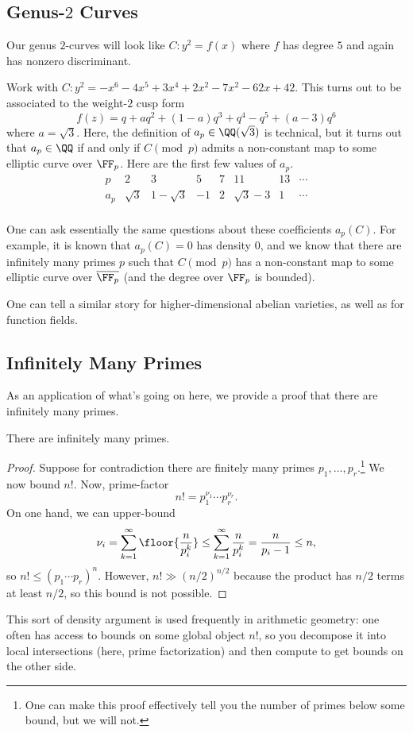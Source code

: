 \documentclass{article}
\begin{document}
\subsection{Genus-\texorpdfstring{$2$}{2} Curves}
Our genus $2$-curves will look like $C\colon y^2=f(x)$ where $f$ has degree $5$ and again has nonzero discriminant.
\begin{example}
	Work with $C\colon y^2=-x^6-4x^5+3x^4+2x^2-7x^2-62x+42$. This turns out to be associated to the weight-$2$ cusp form
	\[f(z)=q+aq^2+(1-a)q^3+q^4-q^5+(a-3)q^6\]
	where $a=\sqrt3$. Here, the definition of $a_p\in\QQ(\sqrt 3)$ is technical, but it turns out that $a_p\in\QQ$ if and only if $C\pmod p$ admits a non-constant map to some elliptic curve over $\FF_p$. Here are the first few values of $a_p$.
	\[\begin{array}{c|cccccccc}
		p & 2 & 3 & 5 & 7 & 11 & 13 & \cdots \\\hline
		a_p & \sqrt3 & 1-\sqrt3 & -1 & 2 & \sqrt3-3 & 1 & \cdots \\
	\end{array}\]
\end{example}
One can ask essentially the same questions about these coefficients $a_p(C)$. For example, it is known that $a_p(C)=0$ has density $0$, and we know that there are infinitely many primes $p$ such that $C\pmod p$ has a non-constant map to some elliptic curve over $\overline{\FF_p}$ (and the degree over $\FF_p$ is bounded).
\begin{remark}
	One can tell a similar story for higher-dimensional abelian varieties, as well as for function fields.
\end{remark}

\subsection{Infinitely Many Primes}
As an application of what's going on here, we provide a proof that there are infinitely many primes.
\begin{theorem}
	There are infinitely many primes.
\end{theorem}
\begin{proof}
	Suppose for contradiction there are finitely many primes $p_1,\ldots,p_r$.\footnote{One can make this proof effectively tell you the number of primes below some bound, but we will not.} We now bound $n!$. Now, prime-factor
	\[n!=p_1^{\nu_1}\cdots p_r^{\nu_r}.\]
	On one hand, we can upper-bound
	\[\nu_i=\sum_{k=1}^\infty\floor{\frac n{p_i^k}}\le\sum_{k=1}^\infty\frac n{p_i^k}=\frac n{p_i-1}\le n,\]
	so $n!\le(p_1\cdots p_r)^n$. However, $n!\gg(n/2)^{n/2}$ because the product has $n/2$ terms at least $n/2$, so this bound is not possible.
\end{proof}
This sort of density argument is used frequently in arithmetic geometry: one often has access to bounds on some global object $n!$, so you decompose it into local intersections (here, prime factorization) and then compute to get bounds on the other side.
\end{document}
